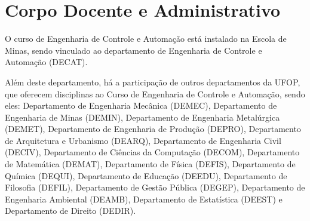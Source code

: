 \documentclass[
	12pt,				%
	openright,			%
	oneside,			%
	a4paper,			%
	english,			%
	brazil				%
	]{abntex2}
\begin{document}
\section{Corpo Docente e Administrativo}
%
O curso de Engenharia de Controle e Automação está instalado na Escola de Minas, sendo vinculado ao departamento de Engenharia de Controle e Automação (DECAT). %

Além deste departamento, há a participação de outros departamentos da UFOP, que oferecem disciplinas ao Curso de Engenharia de Controle e Automação, sendo eles: Departamento de Engenharia Mecânica (DEMEC), Departamento de Engenharia de Minas (DEMIN), Departamento de Engenharia Metalúrgica (DEMET), Departamento de Engenharia de Produção (DEPRO), Departamento de Arquitetura e Urbanismo (DEARQ), Departamento de Engenharia Civil (DECIV), Departamento de Ciências da Computação (DECOM), Departamento de Matemática (DEMAT),  Departamento de Física (DEFIS),  Departamento de Química (DEQUI), Departamento de Educação (DEEDU), Departamento de Filosofia (DEFIL), Departamento de Gestão Pública (DEGEP), Departamento de Engenharia Ambiental (DEAMB), Departamento de Estatística (DEEST) e Departamento de Direito (DEDIR).


\end{document}
